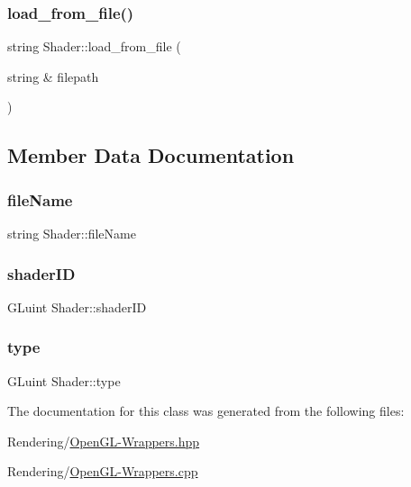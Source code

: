 \mbox{\label{classShader_ad643b976d3d920e95bf6f9f4848e6049}} 
\subsubsection{\texorpdfstring{load\+\_\+from\+\_\+file()}{load\_from\_file()}}
{\footnotesize\ttfamily string Shader\+::load\+\_\+from\+\_\+file (\begin{DoxyParamCaption}\item[{string \&}]{filepath }\end{DoxyParamCaption})}



\subsection{Member Data Documentation}
\mbox{\label{classShader_a32243cdb8d63a829450d0a46686c629b}} 
\subsubsection{\texorpdfstring{file\+Name}{fileName}}
{\footnotesize\ttfamily string Shader\+::file\+Name}

\mbox{\label{classShader_ae94be9c66b18fe70ed6ec0863b416bdf}} 
\subsubsection{\texorpdfstring{shader\+ID}{shaderID}}
{\footnotesize\ttfamily G\+Luint Shader\+::shader\+ID}

\mbox{\label{classShader_a855410473ea5bf5ea56e37f6c09543da}} 
\subsubsection{\texorpdfstring{type}{type}}
{\footnotesize\ttfamily G\+Luint Shader\+::type}



The documentation for this class was generated from the following files\+:\begin{DoxyCompactItemize}
\item 
Rendering/\mbox{\hyperlink{OpenGL-Wrappers_8hpp}{Open\+G\+L-\/\+Wrappers.\+hpp}}\item 
Rendering/\mbox{\hyperlink{OpenGL-Wrappers_8cpp}{Open\+G\+L-\/\+Wrappers.\+cpp}}\end{DoxyCompactItemize}
